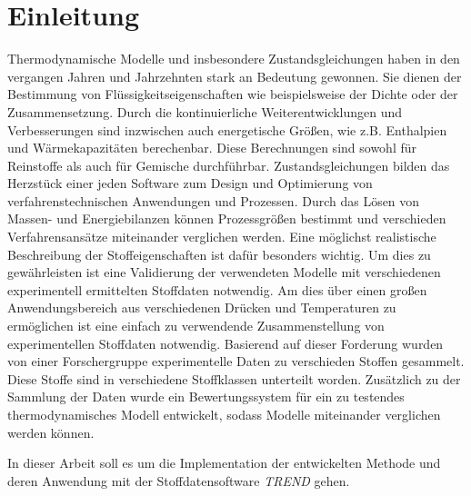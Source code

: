 \documentclass[../thesis.tex]{subfiles}
\begin{document}
\chapter{Einleitung}
\label{chp:Motivation}
Thermodynamische Modelle und insbesondere Zustandsgleichungen haben in den vergangen Jahren und Jahrzehnten stark an Bedeutung gewonnen. Sie dienen der Bestimmung von Flüssigkeitseigenschaften wie beispielsweise der Dichte oder der Zusammensetzung. Durch die kontinuierliche Weiterentwicklungen und Verbesserungen sind inzwischen auch energetische Größen, wie z.B. Enthalpien und Wärmekapazitäten berechenbar. Diese Berechnungen sind sowohl für Reinstoffe als auch für Gemische durchführbar.
Zustandsgleichungen bilden das Herzstück einer jeden Software zum Design und Optimierung von verfahrenstechnischen Anwendungen und Prozessen. Durch das Lösen von Massen- und Energiebilanzen können Prozessgrößen bestimmt und verschieden Verfahrensansätze miteinander verglichen werden. Eine möglichst realistische Beschreibung der Stoffeigenschaften ist dafür besonders wichtig. Um dies zu gewährleisten ist eine Validierung der verwendeten Modelle mit verschiedenen experimentell ermittelten Stoffdaten notwendig. Am dies über einen großen Anwendungsbereich aus verschiedenen Drücken und Temperaturen zu ermöglichen ist eine einfach zu verwendende Zusammenstellung von experimentellen Stoffdaten notwendig.
Basierend auf dieser Forderung wurden von einer Forschergruppe experimentelle Daten zu verschieden Stoffen gesammelt. Diese Stoffe sind in verschiedene Stoffklassen unterteilt worden. Zusätzlich zu der Sammlung der Daten wurde ein Bewertungssystem für ein zu testendes thermodynamisches Modell entwickelt, sodass Modelle miteinander verglichen werden können. \cite{jaubert2020benchmark}

In dieser Arbeit soll es um die Implementation der entwickelten Methode und deren Anwendung mit der Stoffdatensoftware \textit{TREND} gehen.
\end{document}
